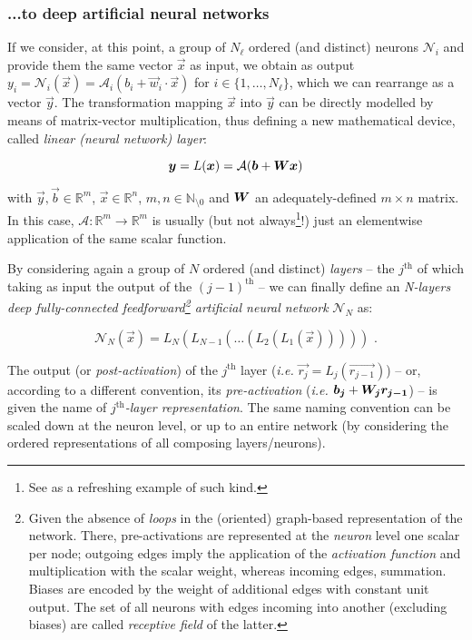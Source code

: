 \subsubsection{...to deep artificial neural networks}

If we consider, at this point, a group of $N_{\ell}$ ordered (and distinct) neurons $\mathcal{N}_i$ and provide them the same vector $\vec{x}$ as input, we obtain as output $y_i = \mathcal{N}_i(\vec{x}) = \mathcal{A}_i(b_i + \vec{w}_i \cdot \vec{x})$ for $i \in \{1, \dots, N_{\ell}\}$, which we can rearrange as a vector $\vec{y}$. The transformation mapping $\vec{x}$ into $\vec{y}$ can be directly modelled by means of matrix-vector multiplication, thus defining a new mathematical device, called \textit{linear (neural network) layer}:

$$\bm{y} = L(\bm{x}) = \mathcal{A}(\bm{b} + \bm{W}\bm{x})$$

with $\vec{y}, \vec{b} \in \mathbb{R}^m$, $\vec{x} \in \mathbb{R}^n$, $m,n \in \mathbb{N}_{\setminus0}$ and $\bm{W}$ an adequately-defined $m \times n$ matrix. In this case, $\mathcal{A}: \mathbb{R}^m \rightarrow \mathbb{R}^m$ is usually (but not always\footnote{See \cite{Xiao2020Enhancing} as a refreshing example of such kind.}!) just an elementwise application of the same scalar function.

By considering again a group of $N$ ordered (and distinct) \textit{layers} -- the $j^{\text{th}}$ of which taking as input the output of the $(j-1)^{\text{th}}$ -- we can finally define an \textit{N-layers deep fully-connected feedforward\footnote{\label{graphrepr}Given the absence of \textit{loops} in the (oriented) graph-based representation of the network. There, pre-activations are represented at the \textit{neuron} level one scalar per node; outgoing edges imply the application of the \textit{activation function} and multiplication with the scalar weight, whereas incoming edges, summation. Biases are encoded by the weight of additional edges with constant unit output. The set of all neurons with edges incoming into another (excluding biases) are called \textit{receptive field} of the latter.} artificial neural network} $\mathcal{N}_N$ as:

$$\mathcal{N}_N(\vec{x}) = L_N(L_{N-1}(\dots (L_2(L_1(\vec{x}))))) \text{ .}$$

The output (or \textit{post-activation}) of the $j^{\text{th}}$ layer (\textit{i.e.} $\vec{r_j} = L_j(\vec{r_{j-1}})$) -- or, according to a different convention, its \textit{pre-activation} (\textit{i.e.} $\bm{b_j} + \bm{W_j}\bm{r_{j-1}}$) -- is given the name of \textit{$j^{\text{th}}$-layer representation}. The same naming convention can be scaled down at the neuron level, or up to an entire network (by considering the ordered representations of all composing layers/neurons).

